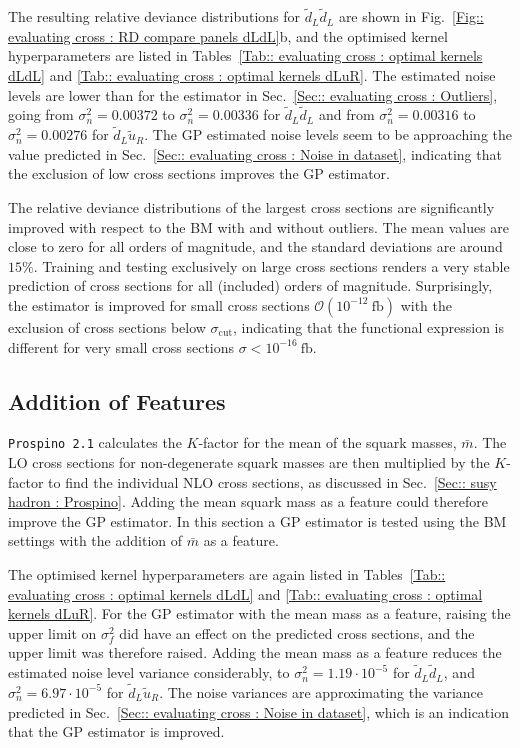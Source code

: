 \documentclass[twoside,english]{uiofysmaster}
\begin{document}
{{The resulting relative deviance distributions for $\widetilde{d}_L \widetilde{d}_L$ are shown in Fig.~\ref{Fig:: evaluating cross : RD compare panels dLdL}b, and the optimised kernel hyperparameters are listed in Tables~\ref{Tab:: evaluating cross : optimal kernels dLdL} and \ref{Tab:: evaluating cross : optimal kernels dLuR}. The estimated noise levels are lower than for the estimator in Sec.~\ref{Sec:: evaluating cross : Outliers}, going from $\sigma_n^2=0.00372$ to $\sigma_n^2 = 0.00336$ for $\widetilde{d}_L \widetilde{d}_L$ and from $\sigma_n^2=0.00316$ to $\sigma_n^2=0.00276$ for $\widetilde{d}_L \widetilde{u}_R$. The GP estimated noise levels seem to be approaching the value predicted in Sec.~\ref{Sec:: evaluating cross : Noise in dataset}, indicating that the exclusion of low cross sections improves the GP estimator. 

The relative deviance distributions of the largest cross sections are significantly improved with respect to the BM with and without outliers. The mean values are close to zero for all orders of magnitude, and the standard deviations are around $15\%$. Training and testing exclusively on large cross sections renders a very stable prediction of cross sections for all (included) orders of magnitude. Surprisingly, the estimator is improved for small cross sections $\mathcal{O}(10^{-12}~\mathrm{fb})$ with the exclusion of cross sections below $\sigma_{\mathrm{cut}}$, indicating that the functional expression is different for very small cross sections $\sigma < 10^{-16}~\mathrm{fb}$.

\subsection{Addition of Features}

\verb|Prospino 2.1| calculates the $K$-factor for the mean of the squark masses, $\bar{m}$. The LO cross sections for non-degenerate squark masses are then multiplied by the $K$-factor to find the individual NLO cross sections, as discussed in Sec.~\ref{Sec:: susy hadron : Prospino}. Adding the mean squark mass as a feature could therefore improve the GP estimator. In this section a GP estimator is tested using the BM settings with the addition of $\bar{m}$ as a feature.

The optimised kernel hyperparameters are again listed in Tables~\ref{Tab:: evaluating cross : optimal kernels dLdL} and \ref{Tab:: evaluating cross : optimal kernels dLuR}. For the GP estimator with the mean mass as a feature, raising the upper limit on $\sigma_f^2$ did have an effect on the predicted cross sections, and the upper limit was therefore raised. Adding the mean mass as a feature reduces the estimated noise level variance considerably, to $\sigma_n^2 = 1.19 \cdot 10^{-5}$ for $\widetilde{d}_L \widetilde{d}_L$, and $\sigma_n^2 = 6.97 \cdot 10^{-5}$ for $\widetilde{d}_L \widetilde{u}_R$. The noise variances are approximating the variance predicted in Sec.~\ref{Sec:: evaluating cross : Noise in dataset}, which is an indication that the GP estimator is improved. 

}}
\end{document}
